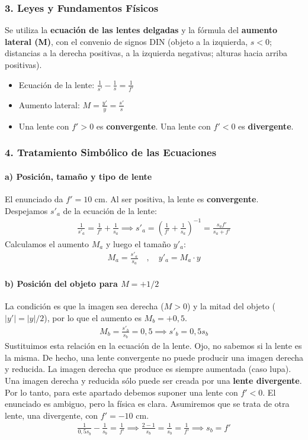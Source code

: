 \subsubsection*{3. Leyes y Fundamentos Físicos}
Se utiliza la \textbf{ecuación de las lentes delgadas} y la fórmula del \textbf{aumento lateral (M)}, con el convenio de signos DIN (objeto a la izquierda, $s<0$; distancias a la derecha positivas, a la izquierda negativas; alturas hacia arriba positivas).
\begin{itemize}
    \item Ecuación de la lente: $\frac{1}{s'} - \frac{1}{s} = \frac{1}{f'}$
    \item Aumento lateral: $M = \frac{y'}{y} = \frac{s'}{s}$
    \item Una lente con $f'>0$ es \textbf{convergente}. Una lente con $f'<0$ es \textbf{divergente}.
\end{itemize}

\subsubsection*{4. Tratamiento Simbólico de las Ecuaciones}
\paragraph*{a) Posición, tamaño y tipo de lente}
El enunciado da $f' = 10$ cm. Al ser positiva, la lente es \textbf{convergente}.
Despejamos $s'_a$ de la ecuación de la lente:
\begin{gather}
    \frac{1}{s'_a} = \frac{1}{f'} + \frac{1}{s_a} \implies s'_a = \left(\frac{1}{f'} + \frac{1}{s_a}\right)^{-1} = \frac{s_a f'}{s_a + f'}
\end{gather}
Calculamos el aumento $M_a$ y luego el tamaño $y'_a$:
\begin{gather}
    M_a = \frac{s'_a}{s_a} \quad , \quad y'_a = M_a \cdot y
\end{gather}

\paragraph*{b) Posición del objeto para $M = +1/2$}
La condición es que la imagen sea derecha ($M>0$) y la mitad del objeto ($|y'|=|y|/2$), por lo que el aumento es $M_b = +0,5$.
\begin{gather}
    M_b = \frac{s'_b}{s_b} = 0,5 \implies s'_b = 0,5 s_b
\end{gather}
Sustituimos esta relación en la ecuación de la lente. Ojo, no sabemos si la lente es la misma. De hecho, una lente convergente no puede producir una imagen derecha y reducida. La imagen derecha que produce es siempre aumentada (caso lupa). Una imagen derecha y reducida sólo puede ser creada por una \textbf{lente divergente}. Por lo tanto, para este apartado debemos suponer una lente con $f' < 0$. El enunciado es ambiguo, pero la física es clara. Asumiremos que se trata de otra lente, una divergente, con $f'=-10$ cm.
\begin{gather}
    \frac{1}{0,5 s_b} - \frac{1}{s_b} = \frac{1}{f'} \implies \frac{2-1}{s_b} = \frac{1}{s_b} = \frac{1}{f'} \implies s_b = f'
\end{gather}

